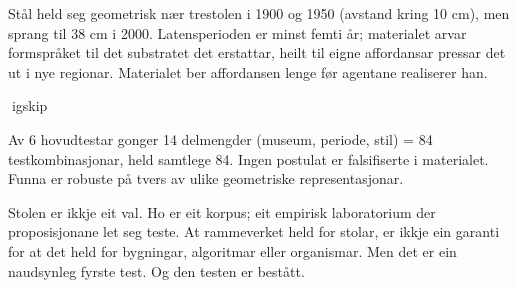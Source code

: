 Stål held seg geometrisk nær trestolen i 1900 og 1950 (avstand kring 10 cm), men sprang til 38 cm i 2000. Latensperioden er minst femti år; materialet arvar formspråket til det substratet det erstattar, heilt til eigne affordansar pressar det ut i nye regionar. Materialet ber affordansen lenge før agentane realiserer han.

igskip

Av 6 hovudtestar gonger 14 delmengder (museum, periode, stil) = 84 testkombinasjonar, held samtlege 84. Ingen postulat er falsifiserte i materialet. Funna er robuste på tvers av ulike geometriske representasjonar.

\begin{overgang}
Stolen er ikkje eit val. Ho er eit korpus; eit empirisk laboratorium der proposisjonane let seg teste. At rammeverket held for stolar, er ikkje ein garanti for at det held for bygningar, algoritmar eller organismar. Men det er ein naudsynleg fyrste test. Og den testen er bestått.
\end{overgang}
